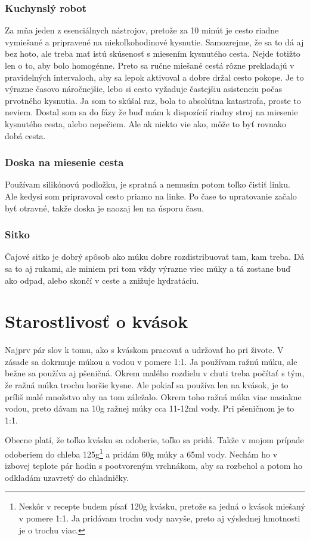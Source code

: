 \documentclass[a4paper,12pt]{article}
\begin{document}
\subsubsection{Kuchynslý robot}
Za mňa jeden z esenciálnych nástrojov, pretože za 10 minút je cesto riadne vymiešané a pripravené na niekoľkohodinové kysnutie. Samozrejme, že sa to dá aj bez hoto, ale treba mať istú skúsenosť s miesením kysnutého cesta. Nejde totižto len o to, aby bolo homogénne. Preto sa ručne miešané cestá rôzne prekladajú v pravidelných intervaloch, aby sa lepok aktivoval a dobre držal cesto pokope. Je to výrazne časovo náročnejšie, lebo si cesto vyžaduje častejšiu asistenciu počas prvotného kysnutia. Ja som to skúšal raz, bola to absolútna katastrofa, proste to neviem. Dostal som sa do fázy že buď mám k dispozícií riadny stroj na miesenie kysnutého cesta, alebo nepečiem. Ale ak niekto vie ako, môže to byť rovnako dobá cesta.
\subsubsection{Doska na miesenie cesta}
Používam silikónovú podložku, je spratná a nemusím potom toľko čistiť linku. Ale kedysi som pripravoval cesto priamo na linke. Po čase to upratovanie začalo byť otravné, takže doska je naozaj len na úsporu času.
\subsubsection{Sitko}
Čajové sitko je dobrý spôsob ako múku dobre rozdistribuovať tam, kam treba. Dá sa to aj rukami, ale miniem pri tom vždy výrazne viec múky a tá zostane buď ako odpad, alebo skončí v ceste a znižuje hydratáciu.

\section{Starostlivosť o kvások}
Najprv pár slov k tomu, ako s kváskom pracovať a udržovať ho pri živote. V zásade sa dokrmuje múkou a vodou v pomere 1:1. Ja používam ražnú múku, ale bežne sa používa aj pšeničná. Okrem malého rozdielu v chuti treba počítať s tým, že ražná múka trochu horšie kysne. Ale pokiaľ sa používa len na kvások, je to príliš malé množstvo aby na tom záležalo. Okrem toho ražná múka viac nasiakne vodou, preto dávam na 10g ražnej múky cca 11-12ml vody. Pri pšeničnom je to 1:1.

Obecne platí, že toľko kvásku sa odoberie, toľko sa pridá. Takže v mojom prípade odoberiem do chleba 125g\footnote{Neskôr v recepte budem písať 120g kvásku, pretože sa jedná o kvások miešaný v pomere 1:1. Ja pridávam trochu vody navyše, preto aj výslednej hmotnosti je o trochu viac.} a pridám 60g múky a 65ml vody. Nechám ho v izbovej teplote pár hodín s pootvoreným vrchnákom, aby sa rozbehol a potom ho odkladám uzavretý do chladničky.
\end{document}
